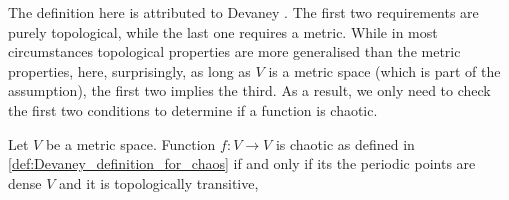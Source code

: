 The definition here is attributed to Devaney \cite{Devaney_green_book_chaos_definition}. 
The first two requirements are purely topological, while the last one requires a metric. 
While in most circumstances topological properties are more generalised than the metric properties, here, surprisingly, as long as $V$ is a metric space (which is part of the assumption), the first two implies the third\cite{Banks}. 
As a result, we only need to check the first two conditions to determine if a function is chaotic.

\begin{thm}
	Let $V$ be a metric space. 
	Function $f: V \rightarrow V$ is chaotic as defined in \ref{def:Devaney_definition_for_chaos}
	if and only if its the periodic points are dense $V$ and it is topologically transitive,
\end{thm}


